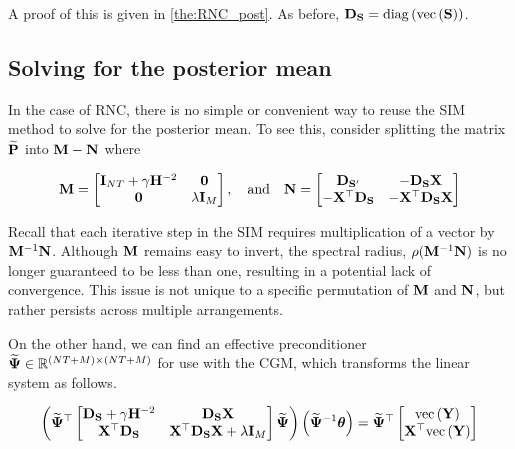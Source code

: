 A proof of this is given in \cref{the:RNC_post}. As before, $\mathbf{D}_{\mathbf{S}} = \text{\textup{diag}}\left(\text{\textup{vec}}\left(\mathbf{S}\right)\right)$. 
    
\subsection{Solving for the posterior mean}

In the case of RNC, there is no simple or convenient way to reuse the SIM method to solve for the posterior mean. To see this, consider splitting the matrix $\widetilde{\mathbf{P}}$ into $\mathbf{M} - \mathbf{N}$ where 

\begin{equation*}
    \mathbf{M} = 
    \begin{bmatrix}
        \mathbf{I}_{NT} + \gamma \mathbf{H}^{-2} & \mathbf{0} \\
        \mathbf{0} & \lambda \mathbf{I}_M   
       \end{bmatrix}, 
       \quad \text{and} \quad \mathbf{N} = \begin{bmatrix}
        \mathbf{D}_{\mathbf{S}'} & -\mathbf{D}_{\mathbf{S}}  \mathbf{X} \\
        -\mathbf{X}^\top \mathbf{D}_{\mathbf{S}} & -\mathbf{X}^\top\mathbf{D}_{\mathbf{S}} \mathbf{X} 
       \end{bmatrix}
\end{equation*}

Recall that each iterative step in the SIM requires multiplication of a vector by $\mathbf{M}^{-1}\mathbf{N}$. Although $\mathbf{M}$ remains easy to invert, the spectral radius, $\rho(\mathbf{M}^{-1}\mathbf{N})$ is no longer guaranteed to be less than one, resulting in a potential lack of convergence. This issue is not unique to a specific permutation of $\mathbf{M}$ and $\mathbf{N}$, but rather persists across multiple arrangements. 

On the other hand, we can find an effective preconditioner $\widetilde{\mathbf{\Psi}}  \in \mathbb{R}^{(NT + M) \times (NT + M)}$ for use with the CGM, which transforms the linear system as follows. 

\begin{equation}
    \left( \widetilde{\mathbf{\Psi}}^\top \begin{bmatrix}
        \mathbf{D}_{\mathbf{S}} + \gamma \mathbf{H}^{-2} & \mathbf{D}_{\mathbf{S}}  \mathbf{X} \\
        \mathbf{X}^\top \mathbf{D}_{\mathbf{S}} & \mathbf{X}^\top \mathbf{D}_{\mathbf{S}} \mathbf{X} + \lambda \mathbf{I}_M   
       \end{bmatrix}  \widetilde{\mathbf{\Psi}} \right) \left( \widetilde{\mathbf{\Psi}}^{-1} \boldsymbol{\theta} \right)   = \widetilde{\mathbf{\Psi}}^\top \begin{bmatrix} \text{\textup{vec}}\left(\mathbf{Y}\right) \\ \mathbf{X}^\top \text{\textup{vec}}\left(\mathbf{Y}\right) \end{bmatrix}
\end{equation}


